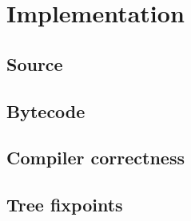\section{Implementation}

    \subsection{Source}


    \subsection{Bytecode}



    \subsection{Compiler correctness}


    \subsection{Tree fixpoints}


